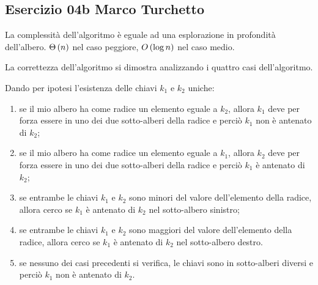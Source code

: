
\subsection[04b MT]{Esercizio 04b Marco Turchetto}


			
La complessità dell'algoritmo è eguale ad una esplorazione in profondità dell'albero. $\Theta\left(n\right)$ nel caso peggiore, $O\left(\log n\right)$ nel caso medio.

La correttezza dell'algoritmo si dimostra analizzando i quattro casi dell'algoritmo.

Dando per ipotesi l'esistenza delle chiavi $k_1$ e $k_2$ uniche:

\begin{enumerate}
\item se il mio albero ha come radice un elemento eguale a $k_2$, allora $k_1$ deve per forza essere in uno dei due sotto-alberi della radice e perciò $k_1$ non è antenato di $k_2$;
	
\item se il mio albero ha come radice un elemento eguale a $k_1$, allora $k_2$ deve per forza essere in uno dei due sotto-alberi della radice e perciò $k_1$ è antenato di $k_2$;
	 
\item se entrambe le chiavi $k_1$ e $k_2$ sono minori del valore dell'elemento della radice, allora cerco se $k_1$ è antenato di $k_2$ nel sotto-albero sinistro;
	
\item se entrambe le chiavi $k_1$ e $k_2$ sono maggiori del valore dell'elemento della radice, allora cerco se $k_1$ è antenato di $k_2$ nel sotto-albero destro.
	
\item se nessuno dei casi precedenti si verifica, le chiavi sono in sotto-alberi diversi e perciò $k_1$ non è antenato di $k_2$.
\end{enumerate}
